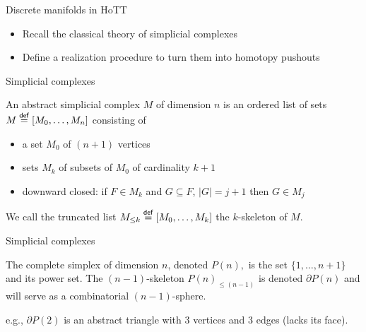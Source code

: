\documentclass[14pt,aspectratio=169]{beamer}
\renewcommand{\defemph}[1]{\alert{#1}}
\begin{document}
\begin{frame}{Discrete manifolds in HoTT}
\begin{itemize}
\item Recall the classical theory of \alert{simplicial complexes}
\item Define a \alert{realization} procedure to turn them into homotopy pushouts
\end{itemize}
\end{frame}

\begin{frame}{Simplicial complexes}
\begin{mydef}
An \defemph{abstract simplicial complex \( M \) of dimension \( n \)} is an ordered list of sets \( M\stackrel{\mathsf{def}}{=}[M_0,\ldots,M_n] \) consisting of 
\begin{itemize}
\item a set \( M_0 \) of \( (n+1) \) vertices
\item sets \( M_k \) of subsets of \( M_0 \) of cardinality \( k+1 \)
\item downward closed: if \( F\in M_k \) and \( G\subseteq F \), \( |G|=j+1 \) then \( G\in M_j \)
\end{itemize}
We call the truncated list \( M_{\leq k}\stackrel{\mathsf{def}}{=} [M_0,\ldots,M_k] \) \alert{the \( k \)-skeleton of \( M \)}.
\end{mydef}
\end{frame}

\begin{frame}{Simplicial complexes}
\begin{example}
The \defemph{complete simplex of dimension \( n \)}, denoted \( P(n), \) is the set \( \{1,\ldots,n+1\} \) and its power set. The \( (n-1) \)-skeleton \( P(n)_{\leq (n-1)} \) is denoted \alert{\( \partial P(n) \)} and will serve as a combinatorial \( (n-1) \)-sphere.
\end{example}
e.g., \( \partial P(2) \) is an abstract triangle with 3 vertices and 3 edges (lacks its face).
\end{frame}
\end{document}
